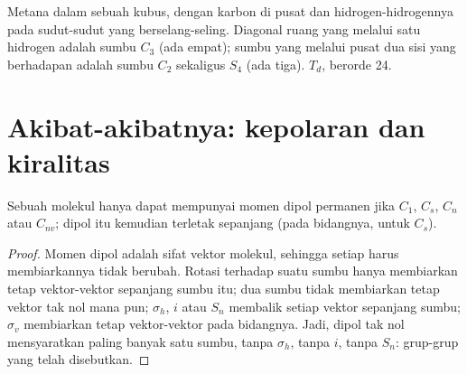 \begin{omfigure}

{\small Metana dalam sebuah kubus, dengan karbon di pusat dan hidrogen-hidrogennya
pada sudut-sudut yang berselang-seling. Diagonal ruang yang melalui satu
hidrogen adalah sumbu $C_3$ (ada empat); sumbu yang melalui pusat dua sisi
yang berhadapan adalah sumbu $C_2$ sekaligus $S_4$ (ada tiga). 
$T_d$, berorde 24.}
\end{omfigure}

\section{Akibat-akibatnya: kepolaran dan kiralitas}

\begin{theorem}\label{thm:b3:point-groups:polar}
Sebuah molekul hanya dapat mempunyai momen dipol permanen jika 
$C_1$, $C_s$, $C_n$ atau $C_{nv}$; dipol itu kemudian terletak sepanjang
 (pada bidangnya, untuk $C_s$).
\end{theorem}

\begin{proof}
Momen dipol adalah sifat vektor molekul, sehingga setiap 
harus membiarkannya tidak berubah. Rotasi terhadap suatu sumbu hanya
membiarkan tetap vektor-vektor sepanjang sumbu itu; dua sumbu tidak
membiarkan tetap vektor tak nol mana pun; $\sigma_h$, $i$ atau $S_n$ membalik
setiap vektor sepanjang sumbu; $\sigma_v$ membiarkan tetap vektor-vektor pada
bidangnya. Jadi, dipol tak nol mensyaratkan paling banyak satu sumbu, tanpa
$\sigma_h$, tanpa $i$, tanpa $S_n$: grup-grup yang telah disebutkan.
\end{proof}

